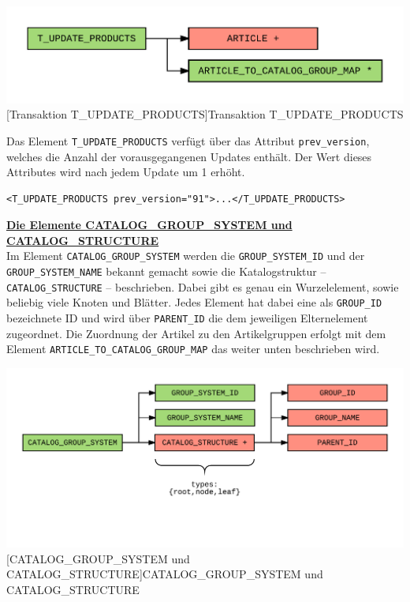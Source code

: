 	\begin{minipage}{\linewidth}
		\vspace{1em}
		\centering
		\includegraphics[width=0.65\linewidth]{img/updateProducts}
		[Transaktion T\_UPDATE\_PRODUCTS]{Transaktion T\_UPDATE\_PRODUCTS}
		\label{fig:header}
		\vspace{1em}
	\end{minipage}
	
	Das Element \texttt{T\_UPDATE\_PRODUCTS} verfügt über das Attribut \texttt{prev\_version}, welches die Anzahl der vorausgegangenen Updates enthält. Der Wert dieses Attributes wird nach jedem Update um 1 erhöht.
	
	\begin{lstlisting}[caption={Das Attribut \texttt{prev\_version} bei der Transaktion T\_UPDATE\_PRODUCTS}] 
	<T_UPDATE_PRODUCTS prev_version="91">...</T_UPDATE_PRODUCTS>
	\end{lstlisting}
	
	
	
	\textbf{\underline{Die Elemente CATALOG\_GROUP\_SYSTEM und CATALOG\_STRUCTURE}}\\
	
	Im Element \texttt{CATALOG\_GROUP\_SYSTEM} werden die \texttt{GROUP\_SYSTEM\_ID} und der \texttt{GROUP\_SYSTEM\_NAME} bekannt gemacht sowie die Katalogstruktur -- \texttt{CATALOG\_STRUCTURE} --  beschrieben. Dabei gibt es genau ein Wurzelelement, sowie beliebig viele Knoten und Blätter. Jedes Element hat dabei eine als \texttt{GROUP\_ID} bezeichnete ID und wird über \texttt{PARENT\_ID} die  dem jeweiligen Elternelement zugeordnet. Die Zuordnung der Artikel zu den Artikelgruppen erfolgt mit dem Element \texttt{ARTICLE\_TO\_CATALOG\_GROUP\_MAP} das weiter unten beschrieben wird.
	
	\begin{minipage}{\linewidth}
		\vspace{1em}
		\centering
		\includegraphics[width=0.85\linewidth]{img/catalogGroupSystem}
		[CATALOG\_GROUP\_SYSTEM und CATALOG\_STRUCTURE]{CATALOG\_GROUP\_SYSTEM und CATALOG\_STRUCTURE}
		\label{fig:header}
		\vspace{1em}
	\end{minipage} 
	
